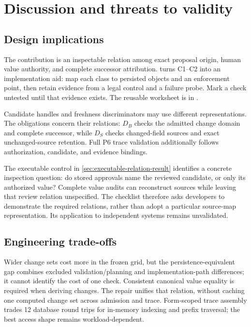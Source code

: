 \section{Discussion and threats to validity}
\label{sec:discussion}

\subsection{Design implications}

The contribution is an inspectable relation among exact proposal origin, human value authority, and complete successor attribution.  turns C1--C2 into an implementation aid: map each class to persisted objects and an enforcement point, then retain evidence from a legal control and a failure probe. Mark a check untested until that evidence exists. The reusable worksheet is in .



Candidate handles and freshness discriminators may use different representations. The obligations concern their relations: $D_B$ checks the admitted change domain and complete successor, while $D_S$ checks changed-field sources and exact unchanged-source retention. Full P6 trace validation additionally follows authorization, candidate, and evidence bindings.

The executable control in \cref{sec:executable-relation-result} identifies a concrete inspection question: do stored approvals name the reviewed candidate, or only its authorized value? Complete value audits can reconstruct sources while leaving that review relation unspecified. The checklist therefore asks developers to demonstrate the required relations, rather than adopt a particular source-map representation. Its application to independent systems remains unvalidated.

\subsection{Engineering trade-offs}

Wider change sets cost more in the frozen grid, but the persistence-equivalent gap combines excluded validation/planning and implementation-path differences; it cannot identify the cost of one check. Consistent canonical value equality is required when deriving changes. The repair unifies that relation, without caching one computed change set across admission and trace. Form-scoped trace assembly trades 12 database round trips for in-memory indexing and prefix traversal; the best access shape remains workload-dependent.

